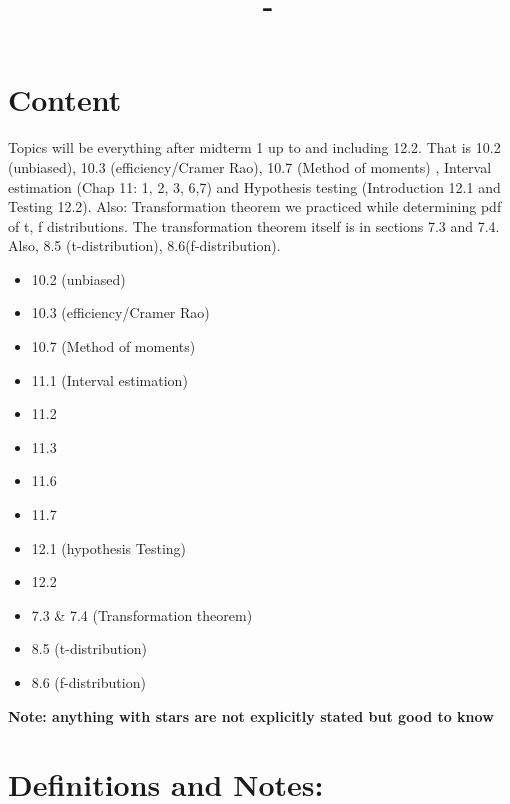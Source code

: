 \documentclass[answers,12pt,addpoints]{exam}
\author{\name}
\title{\course \ - \assignment}
\begin{document}
\maketitle
\tableofcontents


\newpage
\section{Content}
Topics will be everything after midterm 1 up to and including 12.2.  That is 10.2 (unbiased), 10.3 (efficiency/Cramer Rao), 10.7 (Method of moments) ,  Interval estimation (Chap 11: 1, 2, 3,  6,7) and Hypothesis testing (Introduction 12.1 and Testing 12.2). Also: Transformation theorem we practiced while determining pdf of t, f distributions. The transformation theorem itself is in sections 7.3 and 7.4.  Also, 8.5 (t-distribution), 8.6(f-distribution).
\begin{itemize}
    \item 10.2 (unbiased)
    \item 10.3 (efficiency/Cramer Rao)
    \item 10.7 (Method of moments)
    \item 11.1 (Interval estimation)
    \item 11.2
    \item 11.3
    \item 11.6
    \item 11.7
    \item 12.1 (hypothesis Testing)
    \item 12.2
    \item 7.3 \& 7.4 (Transformation theorem)
    \item 8.5 (t-distribution)
    \item 8.6 (f-distribution)
\end{itemize}

\textbf{Note: anything with stars are not explicitly stated but good to know}

\section{Definitions and Notes:}
\end{document}
